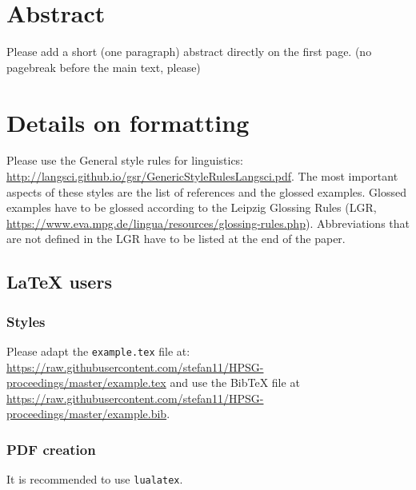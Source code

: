\documentclass[11pt,a4paper,fleqn]{article}
\begin{document}
\section{Abstract}

Please add a short (one paragraph) abstract directly on the first page.
(no pagebreak before the main text, please)


\section{Details on formatting}

Please use the General style rules for linguistics:
\url{http://langsci.github.io/gsr/GenericStyleRulesLangsci.pdf}. The most important aspects of these
styles are the list of references and the glossed examples. Glossed examples have to be glossed
according to the Leipzig Glossing Rules (LGR,
\url{https://www.eva.mpg.de/lingua/resources/glossing-rules.php}). Abbreviations that are not
defined in the LGR have to be listed at the end of the paper.

\subsection{\LaTeX{} users}

\subsubsection{Styles}

Please adapt the \verb+example.tex+ file at:\newline
\url{https://raw.githubusercontent.com/stefan11/HPSG-proceedings/master/example.tex}\newline
and use the BibTeX file at \url{https://raw.githubusercontent.com/stefan11/HPSG-proceedings/master/example.bib}.

\subsubsection{PDF creation}

It is recommended to use \verb+lualatex+. 
%
%
\end{document}
